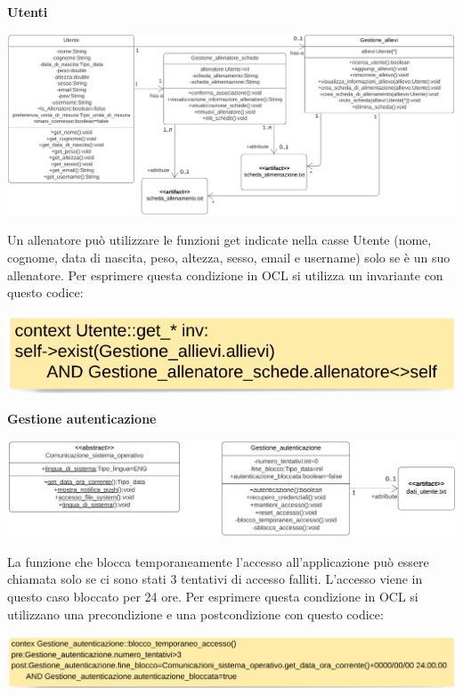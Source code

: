 \documentclass{article}
\begin{document}
    {\large\textbf{Utenti}}\\
    
    \begin{center}
            \includegraphics[scale=0.5]{classi_OCL/Utenti.png}
    \end{center}
    \hfill \break
    
    Un allenatore può utilizzare le funzioni get indicate nella casse Utente (nome, cognome, data di nascita, peso, altezza, sesso, email e username) solo se è un suo allenatore. Per esprimere questa condizione in OCL si utilizza un invariante con questo codice:\\

    
    \begin{center}
            \includegraphics[scale=0.5]{OCL/Utente_nuovo.png}
    \end{center}
    \hfill \break
    
    {\large\textbf{Gestione autenticazione}}\\
    
    \begin{center}
            \includegraphics[scale=0.5]{classi_OCL/Autenticazione 1.png}
    \end{center}
    \hfill \break
    
    La funzione che blocca temporaneamente l’accesso all’applicazione può essere chiamata solo se ci sono stati 3 tentativi di accesso falliti. L’accesso viene in questo caso bloccato per 24 ore. Per esprimere questa condizione in OCL si utilizzano una precondizione e una postcondizione con questo codice: \\
     \begin{center}
            \includegraphics[scale=0.5]{OCL/Gestione autenticazione 1.png}
    \end{center}
    \hfill \break
    
\end{document}
